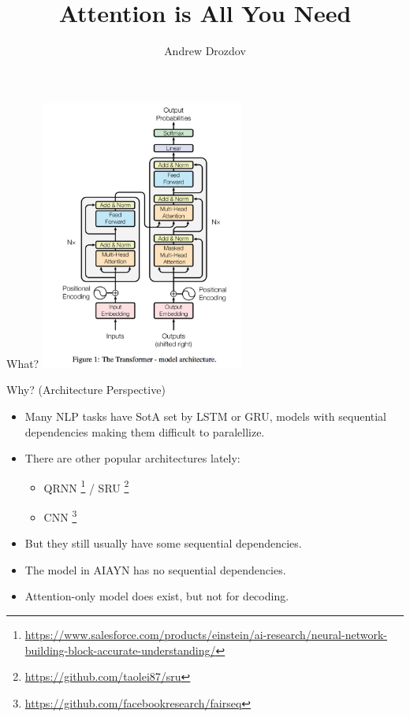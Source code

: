 \documentclass{beamer}
\title[AIAYN]{Attention is All You Need}
\author{Andrew Drozdov}
\begin{document}
\begin{frame}
  \titlepage
\end{frame}
%

\begin{frame}{What?}{}
\centering
\includegraphics[width=0.5\textwidth]{img/transformer.png}
\end{frame}
%

\begin{frame}{Why? (Architecture Perspective)}{}
\begin{itemize}
\item Many NLP tasks have SotA set by LSTM or GRU, models with sequential dependencies making them difficult to paralellize.

\item There are other popular architectures lately:
\begin{itemize}
\item QRNN \footnote[frame]{\url{https://www.salesforce.com/products/einstein/ai-research/neural-network-building-block-accurate-understanding/}} / SRU \footnote[frame]{\url{https://github.com/taolei87/sru}}
\item CNN  \footnote[frame]{\url{https://github.com/facebookresearch/fairseq}}
\end{itemize}
\item[] But they still usually have some sequential dependencies.

\item The model in AIAYN has no sequential dependencies.

\item Attention-only model does exist, but not for decoding.

\end{itemize}
\end{frame}
%
\end{document}
